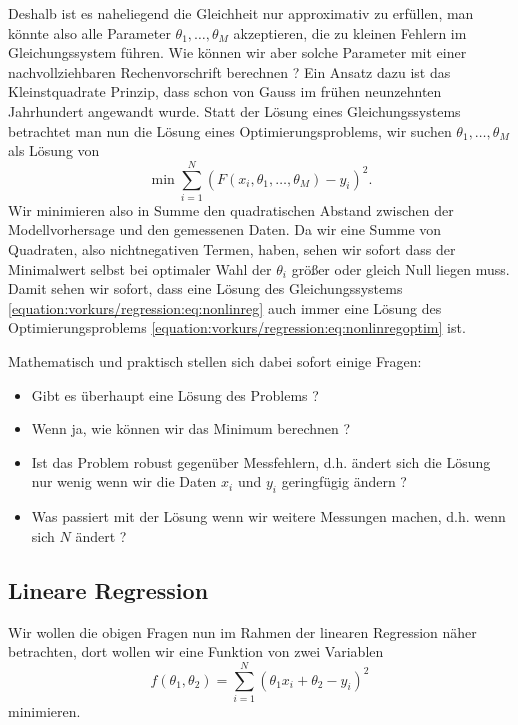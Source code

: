 \documentclass[letterpaper,10pt,english]{jupyterBook}
\begin{document}
Deshalb ist es naheliegend die Gleichheit nur approximativ zu erfüllen, man könnte also alle Parameter \(\theta_1,\ldots,\theta_M\) akzeptieren, die zu kleinen Fehlern im Gleichungssystem führen. Wie können wir aber solche Parameter mit einer nachvollziehbaren Rechenvorschrift berechnen ? Ein Ansatz dazu ist das Kleinstquadrate Prinzip, dass schon von Gauss im frühen neunzehnten Jahrhundert angewandt wurde. Statt der Lösung eines Gleichungssystems betrachtet man nun die Lösung eines Optimierungsproblems, wir suchen \(\theta_1,\ldots,\theta_M\) als Lösung von
\begin{equation}\label{equation:vorkurs/regression:eq:nonlinregoptim}
\min \sum_{i=1}^N ( F(x_i,\theta_1,\ldots,\theta_M) - y_i)^2.
\end{equation}
Wir minimieren also in Summe den quadratischen Abstand zwischen der Modellvorhersage und den gemessenen Daten.
Da wir eine Summe von Quadraten, also nichtnegativen Termen, haben, sehen wir sofort dass der Minimalwert selbst bei optimaler Wahl der \(\theta_i\) größer oder gleich Null liegen muss. Damit sehen wir sofort, dass eine Lösung des Gleichungssystems \eqref{equation:vorkurs/regression:eq:nonlinreg} auch immer eine Lösung des Optimierungsproblems \eqref{equation:vorkurs/regression:eq:nonlinregoptim} ist.

Mathematisch und praktisch stellen sich dabei sofort einige Fragen:
\begin{itemize}
\item {} 
Gibt es überhaupt eine Lösung des Problems ?

\item {} 
Wenn ja, wie können wir das Minimum berechnen ?

\item {} 
Ist das Problem robust gegenüber Messfehlern, d.h. ändert sich die Lösung nur wenig wenn wir die Daten \(x_i\) und \(y_i\) geringfügig ändern ?

\item {} 
Was passiert mit der Lösung wenn wir weitere Messungen machen, d.h. wenn sich \(N\) ändert ?

\end{itemize}


\subsection{Lineare Regression}
\label{\detokenize{vorkurs/regression:lineare-regression}}
Wir wollen die obigen Fragen nun im Rahmen der linearen Regression näher betrachten, dort wollen wir eine Funktion von zwei Variablen
\begin{equation*}
 f(\theta_1,\theta_2) =  \sum_{i=1}^N (\theta_1 x_i + \theta_2 -y_i)^2\end{equation*}
minimieren.
\end{document}
